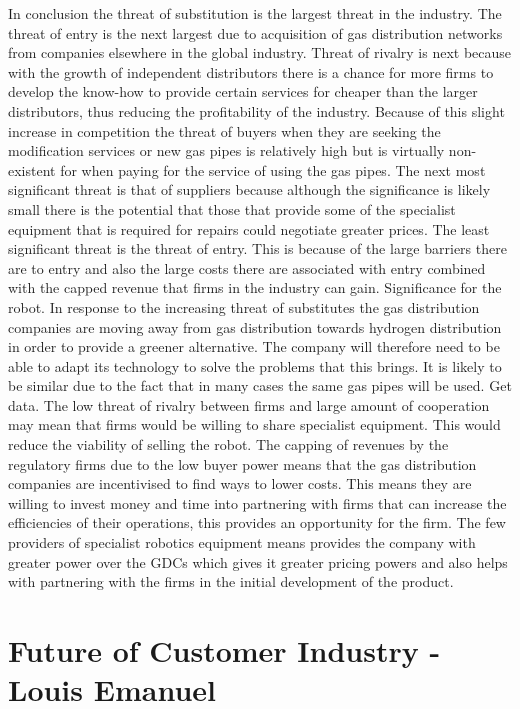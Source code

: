 \documentclass[11pt]{article}		%
\begin{document}
                In conclusion the threat of substitution is the largest threat in the industry. The threat of entry is the next largest due to acquisition of gas distribution networks from companies elsewhere in the global industry.  Threat of rivalry is next because with the growth of independent distributors there is a chance for more firms to develop the know-how to provide certain services for cheaper than the larger distributors, thus reducing the profitability of the industry. Because of this slight increase in competition the threat of buyers when they are seeking the modification services or new gas pipes is relatively high but is virtually non-existent for when paying for the service of using the gas pipes. The next most significant threat is that of suppliers because although the significance is likely small there is the potential that those that provide some of the specialist equipment that is required for repairs could negotiate greater prices. The least significant threat is the threat of entry. This is because of the large barriers there are to entry and also the large costs there are associated with entry combined with the capped revenue that firms in the industry can gain.
                Significance for the robot.
                In response to the increasing threat of substitutes the gas distribution companies are moving away from gas distribution towards hydrogen distribution in order to provide a greener alternative. The company will therefore need to be able to adapt its technology to solve the problems that this brings. It is likely to be similar due to the fact that in many cases the same gas pipes will be used. Get data. 
                The low threat of rivalry between firms and large amount of cooperation may mean that firms would be willing to share specialist equipment. This would  reduce the viability of selling the robot. The capping of revenues by the regulatory firms due to the low buyer power means that the gas distribution companies are incentivised to find ways to lower costs. This means they are willing to invest money and time into partnering with firms that can increase the efficiencies of their operations, this provides an opportunity for the firm.
                The few providers of specialist robotics equipment means provides the company with greater power over the GDCs which gives it greater pricing powers and also helps with partnering with the firms in the initial development of the product.
        \section[Future of Customer Industry - EEM]{Future of Customer Industry - Louis Emanuel} %
		
\end{document}
